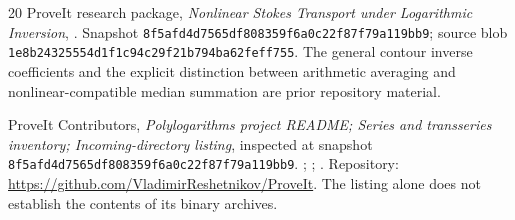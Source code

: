 \documentclass[11pt,a4paper]{article}
\numberwithin{equation}{section}
\theoremstyle{definition}\newtheorem{definition}[theorem]{Definition}
\theoremstyle{remark}\newtheorem{remark}[theorem]{Remark}
\newcommand{\snap}{\texttt{8f5afd4d7565df808359f6a0c22f87f79a119bb9}}
\begin{document}
\begin{thebibliography}{20}
ProveIt research package,
\emph{Nonlinear Stokes Transport under Logarithmic Inversion},
.
Snapshot \snap; source blob
\texttt{1e8b24325554d1f1c94c29f21b794ba62feff755}.
The general contour inverse coefficients and the explicit distinction
between arithmetic averaging and nonlinear-compatible median summation
are prior repository material.

ProveIt Contributors,
\emph{Polylogarithms project README; Series and transseries inventory;
Incoming-directory listing}, inspected at snapshot \snap.
;
;
.
Repository: \url{https://github.com/VladimirReshetnikov/ProveIt}.
The listing alone does not establish the contents of its binary archives.
\end{thebibliography}
\end{document}
